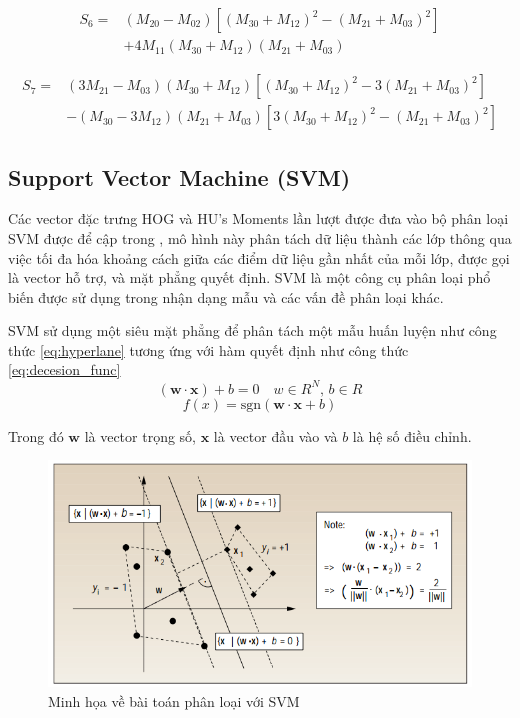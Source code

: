 \documentclass[a4paper]{article}
\begin{document}
\begin{itemize}[label={}]
    \begin{equation}
    \label{eq:S6}
    \begin{aligned}
    S_6 = & (M_{20} - M_{02})[(M_{30} + M_{12})^2 - (M_{21} + M_{03})^2] \\
    & + 4M_{11}(M_{30} + M_{12})(M_{21} + M_{03})
    \end{aligned}
    \end{equation}
    
    \begin{equation}
    \label{eq:S7}
    \begin{aligned}
    S_7 = & (3M_{21} - M_{03})(M_{30} + M_{12})[(M_{30} + M_{12})^2 - 3(M_{21} + M_{03})^2] \\
    & - (M_{30} - 3M_{12})(M_{21} + M_{03})[3(M_{30} + M_{12})^2 - (M_{21} + M_{03})^2]
    \end{aligned}
    \end{equation}
    
\end{itemize}
\subsection{Support Vector Machine (SVM)}
Các vector đặc trưng HOG và HU's Moments lần lượt được đưa vào bộ phân loại SVM được để cập trong \cite{svm}, mô hình này phân tách dữ liệu thành các lớp thông qua việc tối đa hóa khoảng cách giữa các điểm dữ liệu gần nhất của mỗi lớp, được gọi là vector hỗ trợ, và mặt phẳng quyết định. SVM là một công cụ phân loại phổ biến được sử dụng trong nhận dạng mẫu và các vấn đề phân loại khác.

SVM sử dụng một siêu mặt phẳng để phân tách một mẫu huấn luyện như công thức \ref{eq:hyperlane} \cite{svm} tương ứng với hàm quyết định như công thức \ref{eq:decesion_func} \cite{svm}
\begin{equation}
    (\mathbf{w} \cdot \mathbf{x}) + b = 0 \quad w \in R^N, \, b \in R
    \label{eq:hyperlane}
\end{equation}
\begin{equation}
    f(x) = \text{sgn}(\mathbf{w} \cdot \mathbf{x} + b)
    \label{eq:decesion_func}
\end{equation} 

Trong đó \(\mathbf{w}\) là vector trọng số, \(\mathbf{x}\) là vector đầu vào và \(b\) là hệ số điều chỉnh. 

\begin{figure}
    \centering
    \includegraphics[width=0.6\linewidth]{images/svmvd1.png}
    \caption{Minh họa về bài toán phân loại với SVM \cite{svm}}
    \label{fig:svmvd1}
\end{figure}
\end{document}
